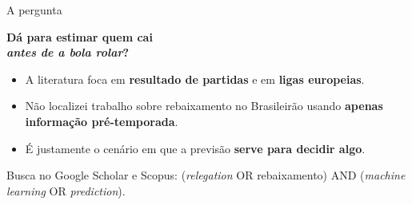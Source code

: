 \documentclass[aspectratio=169,11pt,t]{beamer}
\newcommand{\chave}[1]{%
    \begin{center}
        \begin{minipage}{0.88\textwidth}
            \centering\Large\bfseries\color{azul} #1
        \end{minipage}
    \end{center}
}
\newcommand{\fonte}[1]{{\scriptsize\color{tinta2} #1}}
\begin{document}
\begin{frame}{A pergunta}
    \vspace{0.5cm}
    \chave{Dá para estimar quem cai\\ \emph{antes de a bola rolar}?}

    \vspace{0.55cm}
    \begin{itemize}\itemsep0.25em
        \item A literatura foca em \textbf{resultado de partidas} e em \textbf{ligas europeias}.
        \item Não localizei trabalho sobre rebaixamento no Brasileirão usando
              \textbf{apenas informação pré-temporada}.
        \item É justamente o cenário em que a previsão \textbf{serve para decidir algo}.
    \end{itemize}

    \vspace{0.3cm}
    \fonte{Busca no Google Scholar e Scopus: (\emph{relegation} OR rebaixamento) AND (\emph{machine learning} OR \emph{prediction}).}
\end{frame}
\end{document}
